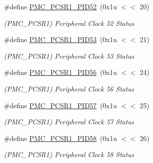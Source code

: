 \begin{DoxyCompactItemize}
\mbox{\label{group__SAMS70__PMC_ga90e469e8c4092e40cf840c357a234820}} 
\#define \mbox{\hyperlink{group__SAMS70__PMC_ga90e469e8c4092e40cf840c357a234820}{P\+M\+C\+\_\+\+P\+C\+S\+R1\+\_\+\+P\+I\+D52}}~(0x1u $<$$<$ 20)
\begin{DoxyCompactList}\small\item\em (P\+M\+C\+\_\+\+P\+C\+S\+R1) Peripheral Clock 52 Status \end{DoxyCompactList}\item 
\mbox{\label{group__SAMS70__PMC_ga428a2719b7cbbd3adf3df7ba2758c588}} 
\#define \mbox{\hyperlink{group__SAMS70__PMC_ga428a2719b7cbbd3adf3df7ba2758c588}{P\+M\+C\+\_\+\+P\+C\+S\+R1\+\_\+\+P\+I\+D53}}~(0x1u $<$$<$ 21)
\begin{DoxyCompactList}\small\item\em (P\+M\+C\+\_\+\+P\+C\+S\+R1) Peripheral Clock 53 Status \end{DoxyCompactList}\item 
\mbox{\label{group__SAMS70__PMC_ga69d2ba5a72f50a7184e1c458c346dfc0}} 
\#define \mbox{\hyperlink{group__SAMS70__PMC_ga69d2ba5a72f50a7184e1c458c346dfc0}{P\+M\+C\+\_\+\+P\+C\+S\+R1\+\_\+\+P\+I\+D56}}~(0x1u $<$$<$ 24)
\begin{DoxyCompactList}\small\item\em (P\+M\+C\+\_\+\+P\+C\+S\+R1) Peripheral Clock 56 Status \end{DoxyCompactList}\item 
\mbox{\label{group__SAMS70__PMC_ga4c7b80912e938e0ce323d8761712eac5}} 
\#define \mbox{\hyperlink{group__SAMS70__PMC_ga4c7b80912e938e0ce323d8761712eac5}{P\+M\+C\+\_\+\+P\+C\+S\+R1\+\_\+\+P\+I\+D57}}~(0x1u $<$$<$ 25)
\begin{DoxyCompactList}\small\item\em (P\+M\+C\+\_\+\+P\+C\+S\+R1) Peripheral Clock 57 Status \end{DoxyCompactList}\item 
\mbox{\label{group__SAMS70__PMC_gaddd97f663c080afc67880dba2e8fb242}} 
\#define \mbox{\hyperlink{group__SAMS70__PMC_gaddd97f663c080afc67880dba2e8fb242}{P\+M\+C\+\_\+\+P\+C\+S\+R1\+\_\+\+P\+I\+D58}}~(0x1u $<$$<$ 26)
\begin{DoxyCompactList}\small\item\em (P\+M\+C\+\_\+\+P\+C\+S\+R1) Peripheral Clock 58 Status \end{DoxyCompactList}\item 
$$
\end{DoxyCompactItemize}
